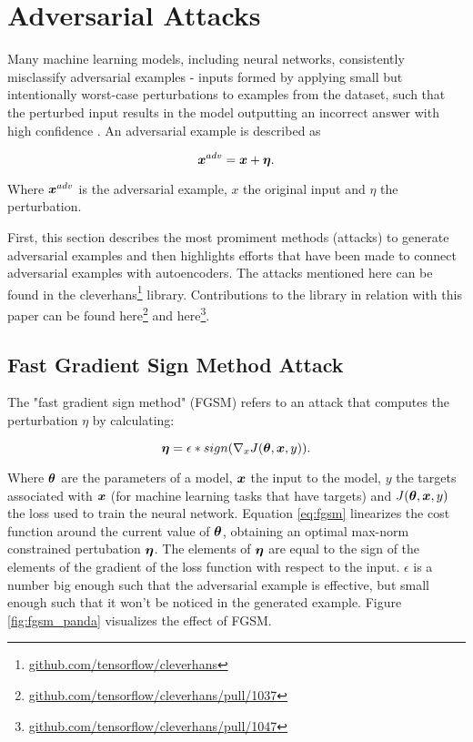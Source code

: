 \section{Adversarial Attacks}\label{sec:adversarial_attacks}

Many machine learning models, including neural networks, consistently
misclassify adversarial examples - inputs formed by applying small but
intentionally worst-case perturbations to examples from the dataset, such that
the perturbed input results in the model outputting an incorrect answer with
high confidence \cite{goodfellow2014explaining}. An adversarial example is
described as

\begin{equation}
    \boldsymbol{x}^{adv}  = \boldsymbol{x} + \boldsymbol{\eta}.
\end{equation}

Where $\boldsymbol{x}^{adv}$ is the adversarial example, $x$ the original input and $\eta$
the perturbation.


First, this section describes the most promiment methods (attacks) to generate
adversarial examples and then highlights efforts that have been made to connect
adversarial examples with autoencoders. The attacks mentioned here can be found
in the
cleverhans\footnote{\href{https://github.com/tensorflow/cleverhans}{github.com/tensorflow/cleverhans}}
library. Contributions to the library in relation with this paper can be found
here\footnote{\href{http://github.com/tensorflow/cleverhans/pull/1037}{github.com/tensorflow/cleverhans/pull/1037}}
and
here\footnote{\href{http://github.com/tensorflow/cleverhans/pull/1047}{github.com/tensorflow/cleverhans/pull/1047}}.


\subsection{Fast Gradient Sign Method Attack}
The "fast gradient sign method" (FGSM) refers to an attack that computes the
perturbation $\eta$ by calculating:

\begin{equation}\label{eq:fgsm}
    \boldsymbol{\eta} = \epsilon * sign(\nabla_x J (\boldsymbol{\theta}, \boldsymbol{x}, y)).
\end{equation}

Where $\boldsymbol{\theta}$ are the parameters of a model, $\boldsymbol{x}$ the input to the
model, $y$ the targets associated with $\boldsymbol{x}$ (for machine learning tasks
that have targets) and $J(\boldsymbol{\theta}, \boldsymbol{x}, y)$ the loss used to train
the neural network. Equation \ref{eq:fgsm} linearizes the cost function around
the current value of $\boldsymbol{\theta}$, obtaining an optimal max-norm constrained
pertubation $\boldsymbol{\eta}$. The elements of $\boldsymbol{\eta}$ are equal to the sign of
the elements of the gradient of the loss function with respect to the input.
$\epsilon$ is a number big enough such that the adversarial example is
effective, but small enough such that it won't be noticed in the generated
example. Figure \ref{fig:fgsm_panda} \cite{goodfellow2014explaining} visualizes
the effect of FGSM.


